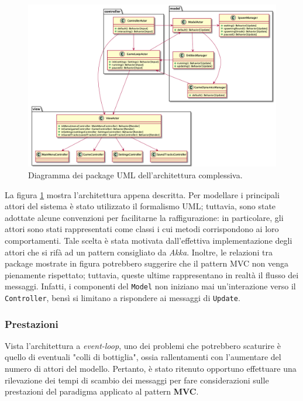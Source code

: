 \begin{figure}[H]
    \centering
    \includegraphics[width=\linewidth]{img/global-architecture}
    \caption{Diagramma dei package UML dell'architettura complessiva.}
    \label{fig:global-architecture}
\end{figure}

La figura \ref{fig:global-architecture} mostra l'architettura appena descritta. Per modellare i principali attori del
sistema è stato utilizzato il formalismo UML; tuttavia, sono state adottate alcune convenzioni per facilitarne la
raffigurazione: in particolare, gli attori sono stati rappresentati come classi i cui metodi corrispondono ai loro
comportamenti. Tale scelta è stata motivata dall'effettiva implementazione degli attori che si rifà ad un pattern
consigliato da \textit{Akka}.
Inoltre, le relazioni tra package mostrate in figura potrebbero suggerire che il pattern MVC non venga pienamente
rispettato; tuttavia, queste ultime rappresentano in realtà il flusso dei messaggi. Infatti, i componenti del
\texttt{Model} non iniziano mai un'interazione verso il \texttt{Controller}, bensì si limitano a rispondere ai messaggi
di \texttt{Update}.

\subsubsection{Prestazioni}
Vista l'architettura a \textit{event-loop}, uno dei problemi che potrebbero scaturire è quello di eventuali "colli di
bottiglia", ossia rallentamenti con l'aumentare del numero di attori del modello. Pertanto, è stato ritenuto opportuno
effettuare una rilevazione dei tempi di scambio dei messaggi per fare considerazioni sulle prestazioni del paradigma
applicato al pattern \textbf{MVC}.

